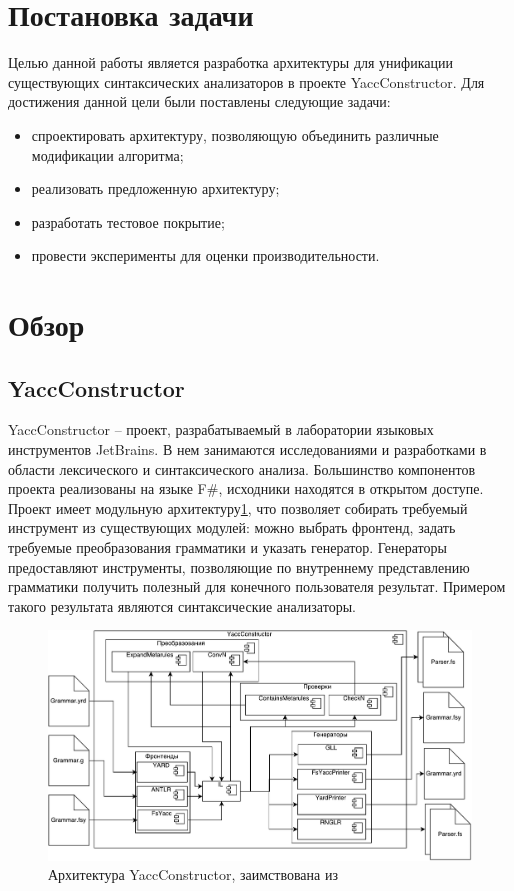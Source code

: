 \documentclass[14pt]{matmex-diploma}
\begin{document}
\section{Постановка задачи}
Целью данной работы является разработка архитектуры для унификации существующих синтаксических анализаторов в проекте YaccConstructor. Для достижения данной цели были поставлены следующие задачи:
\begin{itemize}
    \item спроектировать архитектуру, позволяющую объединить различные модификации алгоритма;
    \item реализовать предложенную архитектуру;
    \item разработать тестовое покрытие;
    \item провести эксперименты для оценки производительности.
\end{itemize}

\section{Обзор}
\subsection{YaccConstructor}
YaccConstructor -- проект, разрабатываемый в лаборатории языковых инструментов JetBrains. В нем занимаются исследованиями и разработками в области лексического и синтаксического анализа. Большинство компонентов проекта реализованы на языке F\#, исходники находятся в открытом доступе. Проект имеет модульную архитектуру\ref{fig:YCArch}, что позволяет собирать требуемый инструмент из существующих модулей: можно выбрать фронтенд, задать требуемые преобразования грамматики и указать генератор. Генераторы предоставляют инструменты, позволяющие по внутреннему представлению грамматики получить полезный для конечного пользователя результат. Примером такого результата являются синтаксические анализаторы.

\begin{figure}[h]
	\includegraphics[width=\textwidth]{images/YCArch}
	\caption{Архитектура YaccConstructor, заимствована из \cite{gsvPhd}}
	\label{fig:YCArch}
\end{figure}
\end{document}
